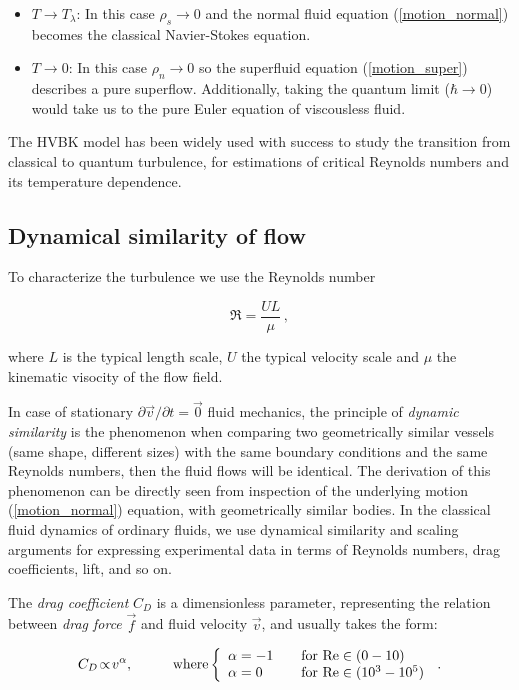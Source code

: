\begin{itemize}
	\item $T \rightarrow T_{\lambda}$: In this case $\rho_s \rightarrow 0$ and the normal fluid equation (\ref{motion_normal}) becomes the classical Navier-Stokes equation.
	\item $T \rightarrow 0$: In this case $\rho_n \rightarrow 0$ so the superfluid equation (\ref{motion_super}) describes a pure superflow. Additionally, taking the quantum limit ($\hbar \rightarrow 0$) would take us to the pure Euler equation of viscousless fluid.
\end{itemize}

The HVBK model has been widely used with success to study the transition from classical to quantum turbulence, for estimations of critical Reynolds numbers and its temperature dependence.

\subsection*{Dynamical similarity of flow}

To characterize the turbulence we use the Reynolds number

\begin{equation}
\Re = \frac{UL}{\mu}\,,
\end{equation}

where $L$ is the typical length scale, $U$ the typical velocity scale and $\mu$ the kinematic visocity of the flow field.

In case of stationary $\partial \vec{v} / \partial t = \vec{0}$ fluid mechanics, the principle of \textit{dynamic similarity} is the phenomenon when comparing two geometrically similar vessels (same shape, different sizes) with the same boundary conditions and the same Reynolds numbers, then the fluid flows will be identical. The derivation of this phenomenon can be directly seen from inspection of the underlying motion (\ref{motion_normal}) equation, with geometrically similar bodies. In the classical fluid dynamics of ordinary fluids, we use dynamical similarity and scaling arguments for expressing experimental data in terms of Reynolds numbers, drag coefficients, lift, and so on.

The \textit{drag coefficient} $C_D$ is a dimensionless parameter, representing the relation between \textit{drag force} $\vec{f}$ and fluid velocity $\vec{v}$, and usually takes the form:

$$
C_D \!\propto\! v^\alpha, \hspace{1cm}
\text{where}
\left\{
  \begin{array}{l l}
    \alpha=-1 & \quad \text{for $\Re \in (0-10)$}\\
    \alpha=0 & \quad \text{for $\Re \in (10^3-10^5)$}
  \end{array}
\right.\,.
$$

